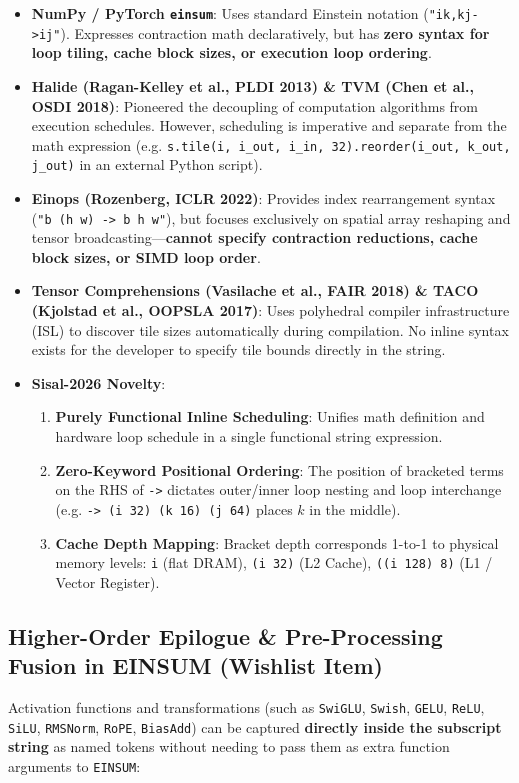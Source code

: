 \begin{itemize}
    \item \textbf{NumPy / PyTorch \texttt{einsum}}: Uses standard Einstein notation (\texttt{"ik,kj->ij"}). Expresses contraction math declaratively, but has \textbf{zero syntax for loop tiling, cache block sizes, or execution loop ordering}.
    \item \textbf{Halide (Ragan-Kelley et al., PLDI 2013) \& TVM (Chen et al., OSDI 2018)}: Pioneered the decoupling of computation algorithms from execution schedules. However, scheduling is imperative and separate from the math expression (e.g. \texttt{s.tile(i, i\_out, i\_in, 32).reorder(i\_out, k\_out, j\_out)} in an external Python script).
    \item \textbf{Einops (Rozenberg, ICLR 2022)}: Provides index rearrangement syntax (\texttt{"b (h w) -> b h w"}), but focuses exclusively on spatial array reshaping and tensor broadcasting---\textbf{cannot specify contraction reductions, cache block sizes, or SIMD loop order}.
    \item \textbf{Tensor Comprehensions (Vasilache et al., FAIR 2018) \& TACO (Kjolstad et al., OOPSLA 2017)}: Uses polyhedral compiler infrastructure (ISL) to discover tile sizes automatically during compilation. No inline syntax exists for the developer to specify tile bounds directly in the string.
    \item \textbf{Sisal-2026 Novelty}:
    \begin{enumerate}
        \item \textbf{Purely Functional Inline Scheduling}: Unifies math definition and hardware loop schedule in a single functional string expression.
        \item \textbf{Zero-Keyword Positional Ordering}: The position of bracketed terms on the RHS of \texttt{->} dictates outer/inner loop nesting and loop interchange (e.g. \texttt{-> (i 32) (k 16) (j 64)} places $k$ in the middle).
        \item \textbf{Cache Depth Mapping}: Bracket depth corresponds 1-to-1 to physical memory levels: \texttt{i} (flat DRAM), \texttt{(i 32)} (L2 Cache), \texttt{((i 128) 8)} (L1 / Vector Register).
    \end{enumerate}
\end{itemize}

\subsection{Higher-Order Epilogue \& Pre-Processing Fusion in EINSUM (Wishlist Item)}
Activation functions and transformations (such as \texttt{SwiGLU}, \texttt{Swish}, \texttt{GELU}, \texttt{ReLU}, \texttt{SiLU}, \texttt{RMSNorm}, \texttt{RoPE}, \texttt{BiasAdd}) can be captured \textbf{directly inside the subscript string} as named tokens without needing to pass them as extra function arguments to \texttt{EINSUM}:

